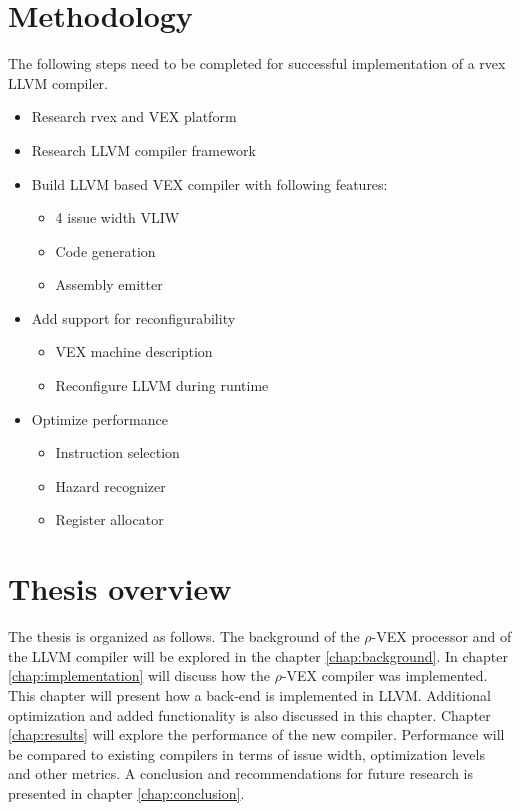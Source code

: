 \section{Methodology}
The following steps need to be completed for successful implementation of a rvex LLVM compiler.
\begin{itemize}
	\item Research rvex and VEX platform
	\item Research LLVM compiler framework
	\item Build LLVM based VEX compiler with following features:
	\begin{itemize}
		\item 4 issue width VLIW
		\item Code generation
		\item Assembly emitter
	\end{itemize}
	\item Add support for reconfigurability
		\begin{itemize}
			\item VEX machine description
			\item Reconfigure LLVM during runtime
		\end{itemize}	
	\item Optimize performance
	\begin{itemize}
		\item Instruction selection
		\item Hazard recognizer
		\item Register allocator
	\end{itemize}	
\end{itemize}




\section{Thesis overview}
The thesis is organized as follows. The background of the $\rho$-VEX processor and of the LLVM compiler will be explored in the chapter \ref{chap:background}. In chapter \ref{chap:implementation} will discuss how the $\rho$-VEX compiler was implemented.  This chapter will present how a back-end is implemented in LLVM. Additional optimization and added functionality is also discussed in this chapter. Chapter \ref{chap:results} will explore the performance of the new compiler. Performance will be compared to existing compilers in terms of issue width, optimization levels and other metrics. A conclusion and recommendations for future research is presented in chapter \ref{chap:conclusion}.  


\acresetall

